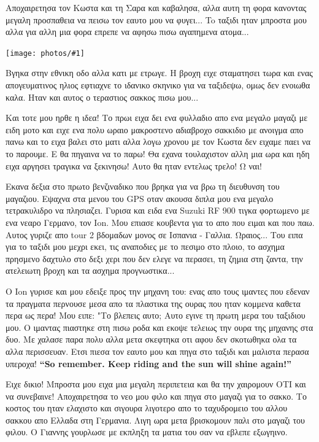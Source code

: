 \documentclass[11pt, letterpaper]{book}
\newcommand\photo[1]{\begin{center}\noindent\texttt{[image: photos/\#1]}\end{center}}
\begin{document}
Αποχαιρετησα τον Κωστα και τη Σαρα και καβαλησα, αλλα αυτη τη φορα κανοντας μεγαλη προσπαθεια να πεισω τον εαυτο μου να φυγει... To ταξιδι ηταν μπροστα μου αλλα για αλλη μια φορα επρεπε να αφησω πισω αγαπημενα ατομα...

\photo{130.jpg}

Βγηκα στην εθνικη οδο αλλα κατι με ετρωγε. Η βροχη ειχε σταματησει τωρα και ενας απογευματινος ηλιος εφτιαχνε το ιδανικο σκηνικο για να ταξιδεψω, ομως δεν ενοιωθα καλα. Ηταν και αυτος ο τεραστιος σακκος πισω μου...

Και τοτε μου ηρθε η ιδεα! Το πρωι ειχα δει ενα φυλλαδιο απο ενα μεγαλο μαγαζι με ειδη μοτο και ειχε ενα πολυ ωραιο μακροστενο αδιαβροχο σακκιδιο με ανοιγμα απο πανω και το ειχα βαλει στο ματι αλλα λογω χρονου με τον Κωστα δεν ειχαμε παει να το παρουμε.
Ε θα πηγαινα να το παρω! Θα εχανα τουλαχιστον αλλη μια ωρα και ηδη ειχα αργησει τραγικα να ξεκινησω! Αυτο θα ηταν εντελως τρελο! Ω ναι!

Εκανα δεξια στο πρωτο βενζιναδικο που βρηκα για να βρω τη διευθυνση του μαγαζιου. Εψαχνα στα μενου του GPS οταν ακουσα διπλα μου ενα μεγαλο τετρακυλιδρο να πλησιαζει. Γυρισα και ειδα ενα Suzuki RF 900 τιγκα φορτωμενο με ενα νεαρο Γερμανο, τον Ion. Μου επιασε κουβεντα για το απο που ειμαι και που παω. 
Αυτος γυριζε απο tour 2 βδομαδων μονος σε Ισπανια - Γαλλια. Ωραιος...
Του ειπα για το ταξιδι μου μεχρι εκει, τις αναποδιες με το πεσιμο στο πλοιο, το ασχημα πρησμενο δαχτυλο στο δεξι χερι που δεν ελεγε να περασει, τη ζημια στη ζαντα, την ατελειωτη βροχη και τα ασχημα προγνωστικα...

Ο Ion γυρισε και μου εδειξε προς την μηχανη του: ενας απο τους ιμαντες που εδεναν τα πραγματα περνουσε μεσα απο τα πλαστικα της ουρας που ηταν κομμενα καθετα περα ως περα!
Μου ειπε: "Το βλεπεις αυτο; Αυτο εγινε τη πρωτη μερα του ταξιδιου μου. Ο ιμαντας πιαστηκε στη πισω ροδα και εκοψε τελειως την ουρα της μηχανης στα δυο. Με χαλασε παρα πολυ αλλα μετα σκεφτηκα οτι αφου δεν σκοτωθηκα ολα τα αλλα περισσευαν. Ετσι πιεσα τον εαυτο μου και πηγα στο ταξιδι και μαλιστα περασα υπεροχα! \textbf{``So remember. Keep riding and the sun will shine again!''}

Ειχε δικιο! Μπροστα μου ειχα μια μεγαλη περιπετεια και θα την χαιρομουν ΟΤΙ και να συνεβαινε! Αποχαιρετησα το νεο μου φιλο και πηγα στο μαγαζι για το σακκο. Το κοστος του ηταν ελαχιστο και σιγουρα λιγοτερο απο το ταχυδρομειο του αλλου σακκου απο Ελλαδα στη Γερμανια. 
Λιγη ωρα μετα βρισκομουν παλι στο μαγαζι του φιλου. Ο Γιαννης γουρλωσε με εκπληξη τα ματια του σαν να εβλεπε εξωγηινο. 
\end{document}
